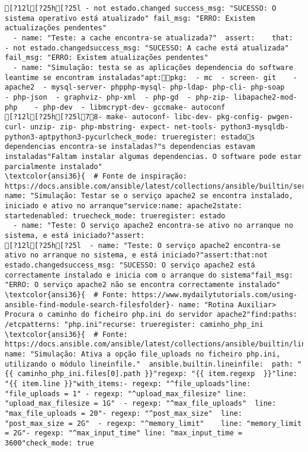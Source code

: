 \documentclass{scrartcl}
\begin{document}
\begin{Verbatim}
[?12l[?25h[?25l - not estado.changed success_msg: "SUCESSO: O sistema operativo está atualizado" fail_msg: "ERRO: Existem actualizações pendentes"
  - name: "Teste: a cache encontra-se atualizada?"  assert:    that:    - not estado.changedsuccess_msg: "SUCESSO: A cache está atualizada"    fail_msg: "ERRO: Existem atualizações pendentes"
  - name: "Simulação: testa se as aplicações dependencia do software leantime se encontram instaladas"apt:pkg:  - mc  - screen- git    - apache2  - mysql-server- phpphp-mysql- php-ldap- php-cli- php-soap    - php-json  - graphviz- php-xml  - php-gd  - php-zip- libapache2-mod-php    - php-dev  - libmcrypt-dev- gccmake- autoconf
[?12l[?25h[?25l78- make- autoconf- libc-dev- pkg-config- pwgen- curl- unzip- zip- php-mbstring- expect- net-tools- python3-mysqldb- python3-aptpython3-pycurlcheck_mode: trueregister: estados dependencias encontra-se instaladas?"s dependencias estavam instaladas"Faltam instalar algumas dependencias. O software pode estar parcialmente instalado"
\textcolor{ansi36}{  # Fonte de inspiração: https://docs.ansible.com/ansible/latest/collections/ansible/builtin/service_module.html}- name: "Simulação: Testar se o serviço apache2 se encontra instalado, iniciado e ativo no arranque"service:name: apache2state: startedenabled: truecheck_mode: trueregister: estado
  - name: "Teste: O serviço apache2 encontra-se ativo no arranque no sistema, e está iniciado?"assert:
[?12l[?25h[?25l  - name: "Teste: O serviço apache2 encontra-se ativo no arranque no sistema, e está iniciado?"assert:that:not estado.changedsuccess_msg: "SUCESSO: O serviço apache2 está correctamente instalado e inicia com o arranque do sistema"fail_msg: "ERRO: O serviço apache2 não se encontra correctamente instalado"
\textcolor{ansi36}{  # Fonte: https://www.mydailytutorials.com/using-ansible-find-module-search-filesfolder}- name: "Rotina Auxiliar> Procura o caminho do ficheiro php.ini do servidor apache2"find:paths: /etcpatterns: "php.ini"recurse: trueregister: caminho_php_ini
\textcolor{ansi36}{  # Fonte: https://docs.ansible.com/ansible/latest/collections/ansible/builtin/lineinfile_module.html}- name: "Simulação: Ativa a opção file_uploads no ficheiro php.ini, utilizando o módulo lineinfile."  ansible.builtin.lineinfile:  path: "{{ caminho_php_ini.files[0].path }}"regexp: "{{ item.regexp  }}"line: "{{ item.line }}"with_items:- regexp: "^file_uploads"line: "file_uploads = 1" - regexp: "^upload_max_filesize" line: "upload_max_filesize = 1G"  - regexp: "^max_file_uploads"  line: "max_file_uploads = 20"- regexp: "^post_max_size"  line: "post_max_size = 2G"  - regexp: "^memory_limit"    line: "memory_limit = 2G"- regexp: "^max_input_time" line: "max_input_time = 3600"check_mode: true

\end{Verbatim}
\end{document}
